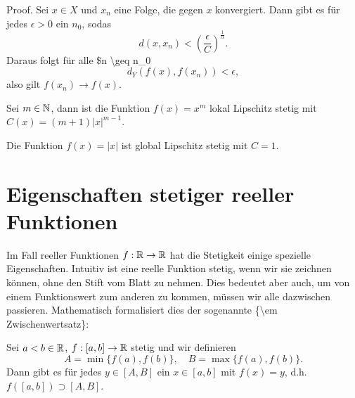 \begin{emphBox}{}{}
Proof.  Sei \(x \in X\) und \(x_n\) eine Folge, die gegen \(x\) konvergiert. Dann gibt es für jedes \(\epsilon > 0\) ein \(n_0\), sodas
\begin{equation*}
 d(x,x_n) < \left( \frac{\epsilon}{C} \right)^{\frac{1}\alpha} .
\end{equation*}
Daraus folgt für alle \$n \textbackslash{}geq n\_0
\begin{equation*}
 d_Y(f(x),f(x_n)) < \epsilon ,
\end{equation*}
also gilt \(f(x_n) \rightarrow f(x). \)
\end{emphBox}
\label{stetigkeit/stetigkeit:example-9}
\begin{example}{}{}



Sei \(m \in \mathbb{N}\), dann ist die Funktion \(f(x)=x^m\) lokal Lipschitz stetig mit \(C(x) = ( m+1) |x|^{m-1}\).
\end{example}
\label{stetigkeit/stetigkeit:example-10}
\begin{example}{}{}



Die Funktion \(f(x)=|x|\) ist global Lipschitz stetig mit \(C=1\).
\end{example}


\section{Eigenschaften stetiger reeller Funktionen}
\label{\detokenize{stetigkeit/eigenschaften:eigenschaften-stetiger-reeller-funktionen}}\label{\detokenize{stetigkeit/eigenschaften::doc}}
Im Fall reeller Funktionen \(f: \mathbb{R} \rightarrow \mathbb{R}\) hat die Stetigkeit einige spezielle Eigenschaften. Intuitiv ist eine reelle Funktion stetig, wenn wir sie zeichnen können, ohne den Stift vom Blatt zu nehmen. Dies bedeutet aber auch, um von einem Funktionswert zum anderen zu kommen, müssen wir alle dazwischen passieren. Mathematisch formalisiert dies der sogenannte \{\textbackslash{}em Zwischenwertsatz\}:
\label{stetigkeit/eigenschaften:theorem-0}
\begin{theorem}{}{}



Sei  \(a<b \in \mathbb{R}\), \(f: [a,b] \rightarrow \mathbb{R}\) stetig und wir definieren
\begin{equation*}
 A = \min\{f(a),f(b)\}, \quad B = \max\{f(a),f(b)\}.
\end{equation*}
Dann gibt es für jedes \(y \in [A,B]\) ein \(x \in [a,b]\) mit \(f(x) =y\), d.h. \(f([a,b]) \supset [A,B]\).
\end{theorem}

